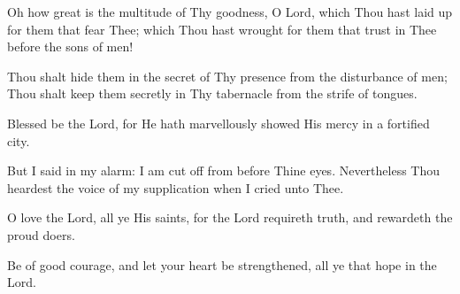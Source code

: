 Oh how great is the multitude of Thy goodness, O Lord, which Thou hast laid up for them that fear Thee; which Thou hast wrought for them that trust in Thee before the sons of men!

Thou shalt hide them in the secret of Thy presence from the disturbance of men; Thou shalt keep them secretly in Thy tabernacle from the strife of tongues.

Blessed be the Lord, for He hath marvellously showed His mercy in a fortified city.

But I said in my alarm: I am cut off from before Thine eyes. Nevertheless Thou heardest the voice of my supplication when I cried unto Thee.

O love the Lord, all ye His saints, for the Lord requireth truth, and rewardeth the proud doers.

Be of good courage, and let your heart be strengthened, all ye that hope in the Lord.
